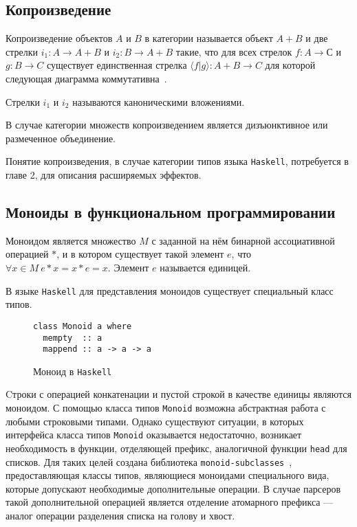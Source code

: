 \subsection{Копроизведение}

Копроизведение объектов $A$ и $B$ в категории называется объект $A + B$ и две
стрелки $i_1 : A \to A + B$ и $i_2 : B \to A + B$ такие, что для всех стрелок
$f : A \to С$ и $g : B \to C$ существует единственная стрелка 
$\langle f|g\rangle  : A + B \to C$ для которой следующая диаграмма 
коммутативна~\cite{TeorCat}.

\begin{center}
\end{center}

Стрелки $i_1$ и $i_2$ называются каноническими вложениями.

В случае категории множеств копроизведением является дизъюнктивное 
или размеченное объединение.  

Понятие копроизведения, в случае категории типов языка \lstinline{Haskell}, 
потребуется в главе 2, для описания расширяемых эффектов.

\subsection{Моноиды в функциональном программировании}

Моноидом является множество $M$ с заданной на нём бинарной ассоциативной 
операцией $*$, и в котором существует такой элемент 
$e$, что $\forall x \in M~e*x = x*e = x$. Элемент $e$ называется единицей.

В языке \lstinline{Haskell} для представления моноидов существует специальный 
класс типов.

\begin{figure}[h]
\begin{lstlisting}
class Monoid a where
  mempty  :: a
  mappend :: a -> a -> a
\end{lstlisting}
\caption{Моноид в \lstinline{Haskell}}
\label{listing:Monoid}
\end{figure}

Cтроки с операцией конкатенации и пустой строкой в качестве единицы являются 
моноидом. С помощью класса типов \lstinline{Monoid} возможна абстрактная работа 
с любыми строковыми типами. Однако существуют ситуации, в которых интерфейса 
класса типов \lstinline{Monoid} оказывается недостаточно, возникает 
необходимость в функции, отделяющей префикс, аналогичной функции 
\lstinline{head} для списков. Для таких целей создана библиотека 
\lstinline{monoid-subclasses}~\cite{monoids}, предоставляющая 
классы типов, являющиеся моноидами специального вида, которые допускают 
необходимые дополнительные операции. В случае парсеров такой дополнительной 
операцией является отделение атомарного префикса --- аналог операции разделения 
списка на голову и хвост.

